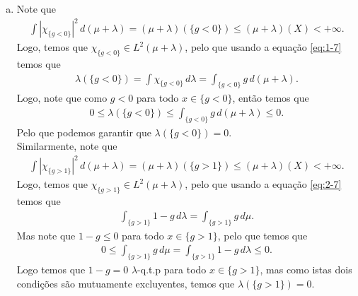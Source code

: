 \begin{homeworkProblem}[7]
\begin{solution}
\begin{enumerate}[a)]
\begin{align*}
        \phi(f+cg)=\int f+cg\,d\lambda =\int f\,d\lambda + c \int g\,d\lambda =\phi(f)+c\phi(g).
      \end{align*}
      Daí que $\phi$ é um funcional linear limitado em $L^{2}(\mu+\lambda)$. Portanto, usando o Teorema de Representação de Riesz, temos que existe uma única $g\in L^{2}(\mu+\lambda)$ tal que
      \begin{equation}\label{eq:1-7}
        \int f\,d\lambda=\phi(f)=\left\langle f,g \right\rangle=\int fg\,d(\mu+\lambda).
      \end{equation}
      Logo isto implica que
      \begin{equation}\label{eq:2-7}
        \int f(1-g)\,d\lambda=\int fg\,d\mu.
      \end{equation}
    \item Note que
      \begin{align*}
        \int |\chi_{\{g<0\}}|^{2}\,d(\mu+\lambda)=(\mu+\lambda)(\{g<0\})\leq (\mu+\lambda)(X)<+\infty.
      \end{align*}
      Logo, temos que $\chi_{\{g<0\}}\in L^{2}(\mu+\lambda)$, pelo que usando a equação \eqref{eq:1-7} temos que
      \begin{align*}
        \lambda(\{g<0\})=\int \chi_{\{g<0\}}\,d\lambda= \int_{\{g<0\}}g\,d(\mu+\lambda).
      \end{align*}
      Logo, note que como $g<0$ para todo $x\in\{g<0\}$, então temos que
      \begin{align*}
        0\leq \lambda(\{g<0\})\leq \int_{\{g<0\}}g\,d(\mu+\lambda)\leq 0.
      \end{align*}
      Pelo que podemos garantir que $\lambda(\{g<0\})=0$.\\
      Similarmente, note que
       \begin{align*}
        \int |\chi_{\{g>1\}}|^{2}\,d(\mu+\lambda)=(\mu+\lambda)(\{g>1\})\leq (\mu+\lambda)(X)<+\infty.
      \end{align*}
      Logo, temos que $\chi_{\{g>1\}}\in L^{2}(\mu+\lambda)$, pelo que usando a equação \eqref{eq:2-7} temos que
      \begin{align*}
        \int_{\{g>1\}}1-g\,d\lambda=\int_{\{g>1\}} g\,d\mu.
      \end{align*}
      Mas note que $1-g\leq 0$ para todo $x\in \{g>1\}$, pelo que temos que
      \begin{align*}
        0\leq \int_{\{g>1\}}g\,d\mu=\int_{\{g>1\}}1-g\,d\lambda\leq 0.
      \end{align*}
      Logo temos que $1-g=0$ $\lambda$-q.t.p para todo $x\in\{g>1\}$, mas como istas dois condições são mutuamente excluyentes, temos que $\lambda(\{g>1\})=0$.\\

\end{enumerate}
\end{solution}
\end{homeworkProblem}
